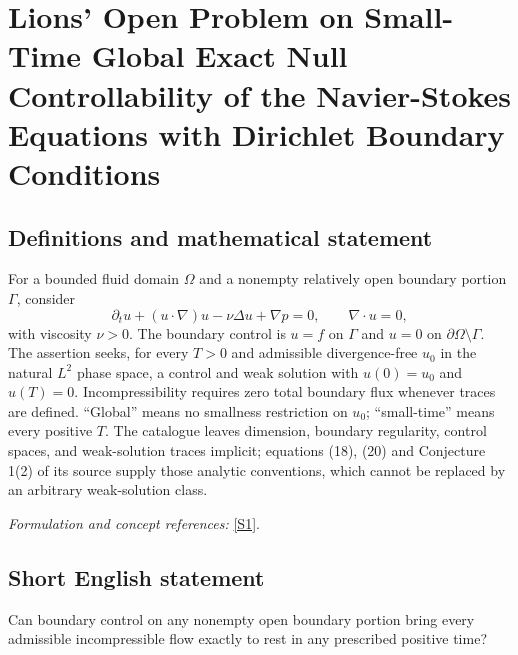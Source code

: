 \documentclass[11pt]{article}
\begin{document}
\section*{\texorpdfstring{Lions' Open Problem on Small-Time Global Exact Null Controllability of the Navier-Stokes Equations with Dirichlet Boundary Conditions}{Lions' Open Problem on Small-Time Global Exact Null Controllability of the Navier-Stokes Equations with Dirichlet Boundary Conditions}}\label{329}
\subsection{Definitions and mathematical statement}
For a bounded fluid domain $\Omega$ and a nonempty relatively open boundary portion $\Gamma$, consider
\[
 \partial_tu+(u\cdot\nabla)u-\nu\Delta u+\nabla p=0,
 \qquad\nabla\cdot u=0,
\]
with viscosity $\nu>0$. The boundary control is $u=f$ on $\Gamma$ and $u=0$ on $\partial\Omega\setminus\Gamma$. The assertion seeks, for every $T>0$ and admissible divergence-free $u_0$ in the natural $L^2$ phase space, a control and weak solution with $u(0)=u_0$ and $u(T)=0$. Incompressibility requires zero total boundary flux whenever traces are defined. ``Global'' means no smallness restriction on $u_0$; ``small-time'' means every positive $T$. The catalogue leaves dimension, boundary regularity, control spaces, and weak-solution traces implicit; equations (18), (20) and Conjecture 1(2) of its source supply those analytic conventions, which cannot be replaced by an arbitrary weak-solution class.
\par\smallskip\textit{Formulation and concept references:} \href{https://link.springer.com/article/10.1007/s40324-024-00363-7}{[S1]}.

\subsection{Short English statement}
Can boundary control on any nonempty open boundary portion bring every admissible incompressible flow exactly to rest in any prescribed positive time?
\end{document}
